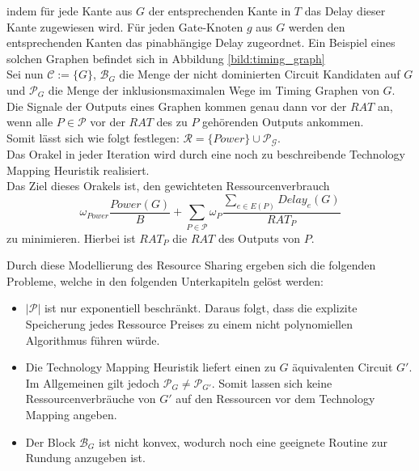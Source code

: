 \documentclass[11pt, a4paper, german]{article}
\newcommand{\TM}{Technology  Mapping }
\begin{document}
indem für jede Kante aus $G$ der entsprechenden Kante in $T$ das Delay dieser Kante zugewiesen wird. 
Für jeden Gate-Knoten $g$ aus $G$ werden den entsprechenden Kanten das pinabhängige Delay zugeordnet. Ein Beispiel eines solchen Graphen befindet sich in Abbildung \ref{bild:timing_graph}\\
Sei nun $\mathcal{C} := \{G\} $, $\mathcal{B}_G$ die Menge der nicht dominierten Circuit Kandidaten auf $G$ und $\mathcal{P}_G$ die Menge der inklusionsmaximalen Wege im Timing Graphen von $G$. Die Signale der Outputs eines Graphen kommen genau dann vor der $RAT$ an, wenn  alle $P \in \mathcal{P}$  vor der $RAT$ des zu $P$ gehörenden Outputs ankommen.\\
Somit lässt sich wie folgt festlegen: $\mathcal{R} = \{Power\} \cup \mathcal{P_G}$. \\
Das Orakel in jeder Iteration wird durch eine noch zu beschreibende \TM Heuristik realisiert. \\
Das Ziel dieses Orakels ist, den gewichteten Ressourcenverbrauch
\begin{equation}\label{eq:ressourcen_verbrauch_1}
\omega _{Power} \frac{Power(G)}{B} + \sum\limits_{P \in \mathcal{P}} \omega _P \frac{\sum_{e \in E(P)}Delay_e(G)}{RAT_P}
\end{equation}
 zu minimieren. Hierbei ist $RAT_P$ die $RAT$ des Outputs von $P$.

Durch diese Modellierung des Resource Sharing ergeben sich die folgenden Probleme, welche in den folgenden Unterkapiteln gelöst werden: \\
\begin{itemize}
	\item $|\mathcal{P}|$ ist nur exponentiell beschränkt. Daraus folgt, dass die explizite Speicherung jedes Ressource Preises zu einem nicht polynomiellen Algorithmus führen würde. 
	\item Die \TM Heuristik liefert einen zu $G$ äquivalenten Circuit $G'$. Im Allgemeinen gilt jedoch $\mathcal{P}_G \neq \mathcal{P}_{G'}$. Somit lassen sich keine Ressourcenverbräuche von $G'$ auf den Ressourcen vor dem \TM angeben.
	\item Der Block $\mathcal{B}_G$ ist nicht konvex, wodurch noch eine geeignete Routine zur Rundung anzugeben ist.
\end{itemize}
\end{document}
